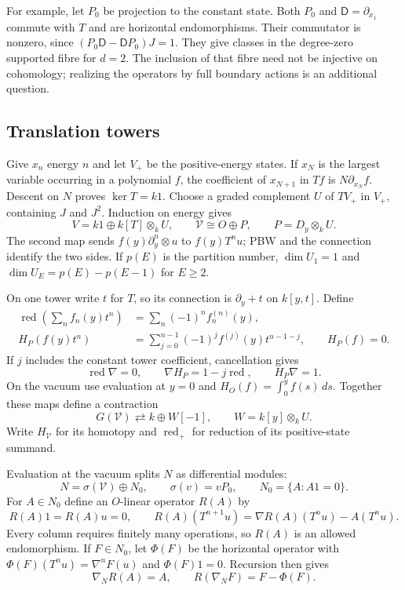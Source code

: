 For example, let $P_0$ be projection to the constant state.
Both $P_0$ and $\mathsf D=\partial_{x_1}$ commute with $T$ and are
horizontal endomorphisms. Their commutator is nonzero, since
$(P_0\mathsf D-\mathsf DP_0)J=1$. They give classes in the
degree-zero supported fibre for $d=2$. The inclusion of that fibre
need not be injective on cohomology; realizing the operators by
full boundary actions is an additional question.

\subsection{Translation towers}

Give $x_n$ energy $n$ and let $V_+$ be the positive-energy states.
If $x_N$ is the largest variable occurring in a polynomial $f$,
the coefficient of $x_{N+1}$ in $Tf$ is
$N\partial_{x_N}f$. Descent on $N$ proves $\ker T=k1$.
Choose a graded complement $U$ of $TV_+$ in $V_+$, containing
$J$ and $J^2$. Induction on energy gives
\begin{equation}\label{eq:vol2-root-towers}
 V=k1\oplus k[T]\otimes_kU,\qquad
 \mathcal V\cong O\oplus P,\qquad P=D_y\otimes_kU.
\end{equation}
The second map sends $f(y)\partial_y^n\otimes u$ to $f(y)T^nu$;
PBW and the connection identify the two sides. If $p(E)$ is the
partition number, $\dim U_1=1$ and
$\dim U_E=p(E)-p(E-1)$ for $E\geq2$.

On one tower write $t$ for $T$, so its connection is
$\partial_y+t$ on $k[y,t]$. Define
\begin{align}\label{eq:vol2-tower-reduction}
 \operatorname{red}\left(\sum_n f_n(y)t^n\right)
    &=\sum_n(-1)^nf_n^{(n)}(y),\\
 H_P(f(y)t^n)&=\sum_{j=0}^{n-1}(-1)^jf^{(j)}(y)t^{n-1-j},
 \qquad H_P(f)=0.\label{eq:vol2-tower-homotopy}
\end{align}
If $j$ includes the constant tower coefficient, cancellation gives
\[
 \operatorname{red}\nabla=0,\qquad
 \nabla H_P=1-j\operatorname{red},\qquad H_P\nabla=1.
\]
On the vacuum use evaluation at $y=0$ and
$H_O(f)=\int_0^yf(s)\,ds$. Together these maps define a contraction
\begin{equation}\label{eq:vol2-state-contraction}
 G(\mathcal V)\rightleftarrows k\oplus W[-1],
 \qquad W=k[y]\otimes_kU.
\end{equation}
Write $H_{\mathcal V}$ for its homotopy and
$\operatorname{red}_+$ for reduction of its positive-state summand.

Evaluation at the vacuum splits $N$ as differential modules:
\[
 N=\sigma(\mathcal V)\oplus N_0,
 \qquad \sigma(v)=vP_0,\qquad N_0=\{A:A1=0\}.
\]
For $A\in N_0$ define an $O$-linear operator $R(A)$ by
\begin{equation}\label{eq:vol2-column-recursion}
 R(A)1=R(A)u=0,\qquad
 R(A)(T^{n+1}u)=\nabla R(A)(T^nu)-A(T^nu).
\end{equation}
Every column requires finitely many operations, so $R(A)$ is an
allowed endomorphism. If $F\in N_0$, let $\Phi(F)$ be the
horizontal operator with $\Phi(F)(T^nu)=\nabla^nF(u)$ and
$\Phi(F)1=0$. Recursion then gives
\[
 \nabla_NR(A)=A,\qquad R(\nabla_NF)=F-\Phi(F).
\]

